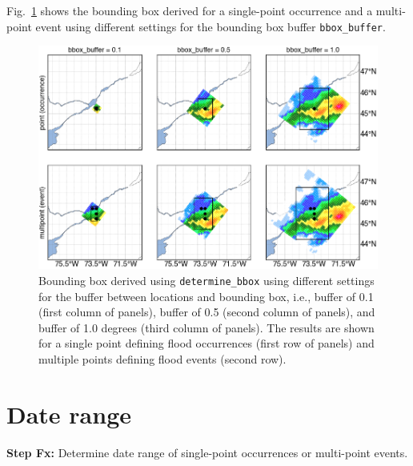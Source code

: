 \documentclass[10pt,a4paper,titlepage,parskip]{scrartcl}
\begin{document}
Fig.~\ref{fig:plot_example:bounding_box} shows the bounding box derived for a single-point occurrence and a multi-point event using different settings for the bounding box buffer \texttt{bbox\_buffer}.

\begin{figure}
	\centering
	\includegraphics[width=0.7\linewidth]{figures/test-bounding-box.png}
	\caption{Bounding box derived using \texttt{determine\_bbox} using different settings for the buffer between locations and bounding box, i.e., buffer of 0.1 (first column of panels), buffer of 0.5 (second column of panels), and buffer of 1.0 degrees (third column of panels). The results are shown for a single point defining flood occurrences (first row of panels) and multiple points defining flood events (second row).}
	\label{fig:plot_example:bounding_box}
\end{figure}
\clearpage

\section{Date range}

\textbf{Step Fx:} Determine date range of single-point occurrences or multi-point events.
\end{document}
